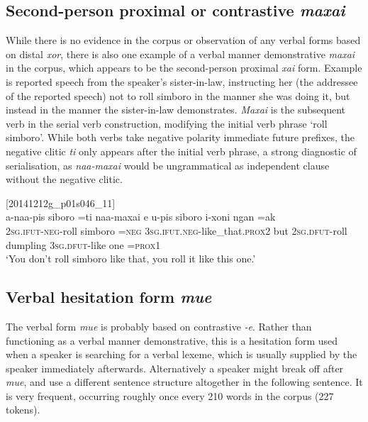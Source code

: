 \documentclass[output=paper,colorlinks,citecolor=brown]{langscibook}
\begin{document}
\subsection{Second-person proximal or contrastive \textit{maxai}}
\label{sec:ridge:5.3}

While there is no evidence in the corpus or observation of any verbal forms based on distal \textit{xor}, there is also one example of a verbal manner demonstrative \textit{maxai} in the corpus, which appears to be the second-person proximal \textit{xai} form. Example  is reported speech from the speaker’s sister-in-law, instructing her (the addressee of the reported speech) not to roll simboro in the manner she was doing it, but instead in the manner the sister-in-law demonstrates. \textit{Maxai} is the subsequent verb in the serial verb construction, modifying the initial verb phrase ‘roll simboro’. While both verbs take negative polarity immediate future prefixes, the negative clitic \textit{ti} only appears after the initial verb phrase, a strong diagnostic of serialisation, as \textit{naa-maxai} would be ungrammatical as independent clause without the negative clitic.

\ea
{\label{ex:ridge:61}[20141212g\_p01s046\_11]}\\
\gll a-naa-pis     siboro   =ti       naa-maxai         e   u-pis       siboro   i-xoni       ngan =ak\\
     \textsc{2sg.ifut}{}-\textsc{neg}{}-roll   simboro   \textsc{=neg} \textsc{3sg.ifut.neg}-like\_that.\textsc{prox2}   but   \textsc{2sg.dfut}{}-roll dumpling   \textsc{3sg.dfut}{}-like   one =\textsc{prox1}\\
\glt ‘You don’t roll simboro like that, you roll it like this one.’
\z


\subsection{Verbal hesitation form \textit{mue}}
\label{sec:ridge:5.4}

The verbal form \textit{mue} is probably based on contrastive \textit{-e}. Rather than functioning as a verbal manner demonstrative, this is a hesitation form used when a speaker is searching for a verbal lexeme, which is usually supplied by the speaker immediately afterwards. Alternatively a speaker might break off after \textit{mue}, and use a different sentence structure altogether in the following sentence. It is very frequent, occurring roughly once every 210 words in the corpus (227 tokens).
\end{document}
